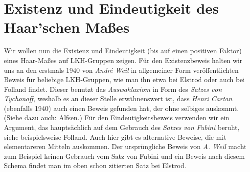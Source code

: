\chapter{Existenz und Eindeutigkeit des Haar'schen Maßes}
Wir wollen nun die Existenz und Eindeutigkeit (bis auf einen positiven Faktor)
eines Haar-Maßes auf LKH-Gruppen zeigen. 
Für den Existenzbeweis halten wir uns an den erstmals 1940 von 
\emph{Andr\'e Weil} in allgemeiner Form veröffentlichten Beweis für beliebige
LKH-Gruppen, wie man ihn etwa bei
Elstrod\cite[Kap.\,VIII,\;\S3,]{bookc:elstrod11} 
oder auch bei Folland\cite[\S11,]{bookc:folland99} findet.
Dieser benutzt das \emph{Auswahlaxiom} in Form des
\emph{Satzes von Tychonoff}, weshalb es an dieser Stelle erwähnenswert ist, dass
\emph{Henri Cartan} (ebenfalls 1940) auch einen Beweis gefunden hat, der ohne
selbiges auskommt. (Siehe dazu auch: Alfsen\cite{artcle:alfsen63}.)
Für den Eindeutigkeitsbeweis verwenden wir ein Argument, das hauptsächlich auf
dem Gebrauch des \emph{Satzes von Fubini} beruht, siehe beispielsweise
Folland\cite[\S11,]{bookc:folland99}. Auch hier gibt es alternative
Beweise, die mit elementareren Mitteln auskommen. Der ursprüngliche Beweis von
\emph{A. Weil} macht zum Beispiel keinen Gebrauch vom Satz von Fubini und ein
Beweis nach diesem Schema findet man im oben schon zitierten Satz bei Elstrod.

